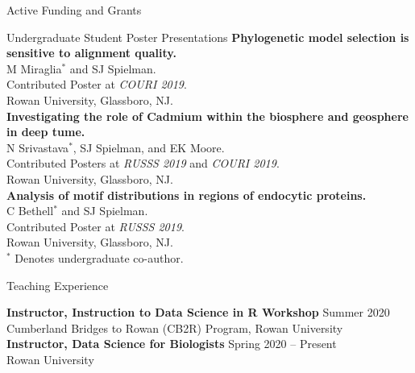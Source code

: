 \documentclass{resume} %
\begin{document}
\begin{rSection}{Active Funding and Grants}
\begin{rSection}{Undergraduate Student Poster Presentations}
\textbf{Phylogenetic model selection is sensitive to alignment quality.}
\\ M Miraglia$^\ast$ and SJ Spielman.
\\ Contributed Poster at \emph{COURI 2019}.
\\ Rowan University, Glassboro, NJ.\\

\textbf{Investigating the role of Cadmium within the biosphere and geosphere in deep tume.}
\\ N Srivastava$^\ast$, SJ Spielman, and EK Moore.
\\ Contributed Posters at \emph{RUSSS 2019} and \emph{COURI 2019}.
\\ Rowan University, Glassboro, NJ.\\

\textbf{Analysis of motif distributions in regions of endocytic proteins.}
\\ C Bethell$^\ast$ and SJ Spielman.
\\ Contributed Poster at \emph{RUSSS 2019}.
\\ Rowan University, Glassboro, NJ.\\


$^\ast$ Denotes undergraduate co-author.

\end{rSection}







\vspace*{0.5cm} 
\begin{rSection}{Teaching Experience}
\vspace*{0.25cm}

\textbf{Instructor, Instruction to Data Science in R Workshop} \hfill Summer 2020 \\ Cumberland Bridges to Rowan (CB2R) Program, Rowan University \\

\textbf{Instructor, Data Science for Biologists} \hfill Spring 2020 -- Present  \\ Rowan University \\


\end{rSection}
\end{rSection}
\end{document}
